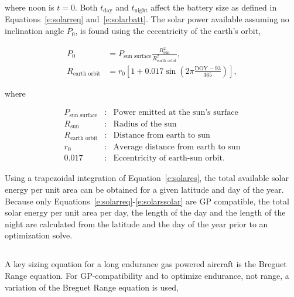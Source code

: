     where noon is $t=0$. Both $t_{\text{day}}$ and $t_{\text{night}}$ affect the battery size as defined in Equations~\eqref{e:solarreq} and~\eqref{e:solarbatt}. The solar power available assuming no inclination angle $P_0$, is found using the eccentricity of the earth's orbit, 

    \begin{align}
        \label{e:solarp0}
        P_0 & = P_{\text{sun surface}} \frac{R_{\text{sun}}^2}{R_{\text{earth orbit}}^2}, \\
        \label{e:solareo}
        R_{\text{earth orbit}} & = r_0 \left[ 1 + 0.017 \sin{\left( 2\pi \frac{\text{DOY}-93}{365}\right)} \right],
    \end{align}

    where 

    \[ \begin{array}{lcl}
        P_{\text{sun surface}} & : & \text{Power emitted at the sun's surface} \\
        R_{\text{sun}} & : & \text{Radius of the sun} \\
        R_{\text{earth orbit}} & : & \text{Distance from earth to sun} \\
        r_0 & : & \text{Average distance from earth to sun} \\
        0.017 & : & \text{Eccentricity of earth-sun orbit}.
    \end{array} \]

    Using a trapezoidal integration of Equation~\eqref{e:solares}, the total available solar energy per unit area can be obtained for a given latitude and day of the year. Because only Equations~\eqref{e:solarreq}-\eqref{e:solarssolar} are GP compatible, the total solar energy per unit area per day, the length of the day and the length of the night are calculated from the latitude and the day of the year prior to an optimization solve.

\subsection{\DIFdelbegin {}\DIFdelend \DIFaddbegin {}\DIFaddend }

\DIFaddbegin \subsubsection{}

\DIFaddend A key sizing equation for a long endurance gas powered aircraft is the Breguet Range equation.  
For GP-compatibility and to optimize endurance, not range, a variation of the Breguet Range equation is used, 

